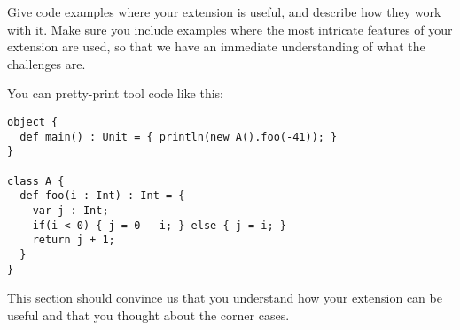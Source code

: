 Give code examples where your extension is useful, and describe how they work
with it. Make sure you include examples where the most intricate features of
your extension are used, so that we have an immediate understanding of what the
challenges are.

You can pretty-print tool code like this:
\begin{lstlisting}
object {
  def main() : Unit = { println(new A().foo(-41)); }
}

class A {
  def foo(i : Int) : Int = {
    var j : Int;
    if(i < 0) { j = 0 - i; } else { j = i; }
    return j + 1;
  }
}
\end{lstlisting}

This section should convince us that you understand how your extension can be
useful and that you thought about the corner cases.
